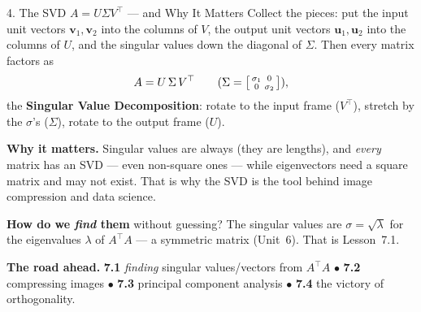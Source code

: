\documentclass[10pt]{article}
\newcommand{\uu}{\mathbf{u}}
\newcommand{\vv}{\mathbf{v}}
\newcommand{\T}{^{\top}}
\begin{document}
\begin{notesbox}{4. The SVD $A=U\Sigma V\T$ --- and Why It Matters}
Collect the pieces: put the input unit vectors $\vv_1,\vv_2$ into the columns of $V$, the output unit
vectors $\uu_1,\uu_2$ into the columns of $U$, and the singular values down the diagonal of $\Sigma$.
Then every matrix factors as
\[
  A = U\,\Sigma\,V\T \qquad(\Sigma=\begin{bsmallmatrix} \sigma_1 & 0\\ 0 & \sigma_2 \end{bsmallmatrix}),
\]
the \textbf{Singular Value Decomposition}: rotate to the input frame ($V\T$), stretch by the
$\sigma$'s ($\Sigma$), rotate to the output frame ($U$).

\vspace{2pt}
\textbf{Why it matters.} Singular values are always  (they are lengths), and
\emph{every} matrix has an SVD --- even non-square ones --- while eigenvectors need a square matrix and
may not exist. That is why the SVD is the tool behind image compression and data science.

\vspace{2pt}
\textbf{How do we \emph{find} them} without guessing? The singular values are $\sigma=\sqrt{\lambda}$ for
the eigenvalues $\lambda$ of $A\T A$ --- a symmetric matrix (Unit~6). That is Lesson~7.1.

\vspace{2pt}
\textbf{The road ahead.} \textbf{7.1} \emph{finding} singular values/vectors from $A\T A$\; $\bullet$\;
\textbf{7.2} compressing images\; $\bullet$\; \textbf{7.3} principal component analysis\; $\bullet$\;
\textbf{7.4} the victory of orthogonality.
\end{notesbox}
\end{document}
